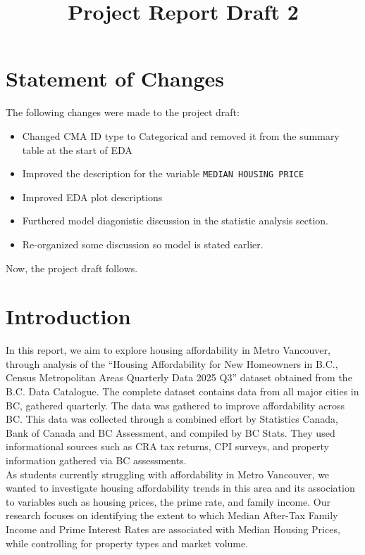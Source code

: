 \documentclass[10pt]{article}
\begin{document}
\section*{Statement of Changes}
The following changes were made to the project draft: 
\begin{itemize}
    \item Changed CMA ID type to Categorical and removed it from the summary table at the start of EDA
    \item Improved the description for the variable \verb|MEDIAN HOUSING PRICE|
    \item Improved EDA plot descriptions
    \item Furthered model diagonistic discussion in the statistic analysis section.
    \item Re-organized some discussion so model is stated earlier.
\end{itemize}
Now, the project draft follows.
\clearpage

\title{Project Report Draft 2}
\maketitle

\section*{Introduction}
In this report, we aim to explore housing affordability in Metro Vancouver, through analysis of the “Housing Affordability for New Homeowners in B.C., Census Metropolitan Areas Quarterly Data 2025 Q3” dataset obtained from the B.C. Data Catalogue. The complete dataset contains data from all major cities in BC, gathered quarterly. The data was gathered to improve affordability across BC. This data was collected through a combined effort by Statistics Canada, Bank of Canada and BC Assessment, and compiled by BC Stats. They used informational sources such as CRA tax returns, CPI surveys, and property information gathered via BC assessments. \href{https://catalogue.data.gov.bc.ca/dataset/b-c-housing-affordability/resource/a71e6838-cda1-4acb-adfb-8515c4f9fec9}{}\\

As students currently struggling with affordability in Metro Vancouver, we wanted to investigate housing affordability trends in this area and its association to variables such as housing prices, the prime rate, and family income. Our research focuses on identifying the extent to which Median After-Tax Family Income and Prime Interest Rates are associated with Median Housing Prices, while controlling for property types and market volume.
\end{document}
